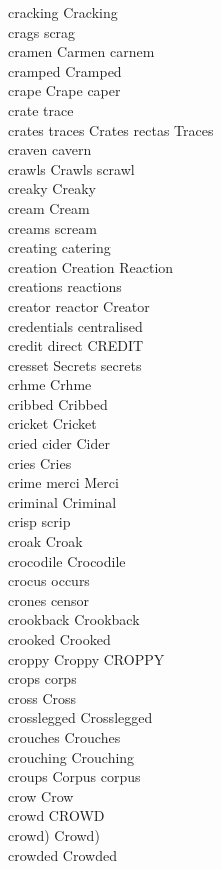 cracking Cracking\\
crags scrag\\
cramen Carmen carnem\\
cramped Cramped\\
crape Crape caper\\
crate trace\\
crates traces Crates rectas Traces\\
craven cavern\\
crawls Crawls scrawl\\
creaky Creaky\\
cream Cream\\
creams scream\\
creating catering\\
creation Creation Reaction\\
creations reactions\\
creator reactor Creator\\
credentials centralised\\
credit direct CREDIT\\
cresset Secrets secrets\\
crhme Crhme\\
cribbed Cribbed\\
cricket Cricket\\
cried cider Cider\\
cries Cries\\
crime merci Merci\\
criminal Criminal\\
crisp scrip\\
croak Croak\\
crocodile Crocodile\\
crocus occurs\\
crones censor\\
crookback Crookback\\
crooked Crooked\\
croppy Croppy CROPPY\\
crops corps\\
cross Cross\\
crosslegged Crosslegged\\
crouches Crouches\\
crouching Crouching\\
croups Corpus corpus\\
crow Crow\\
crowd CROWD\\
crowd) Crowd)\\
crowded Crowded\\
